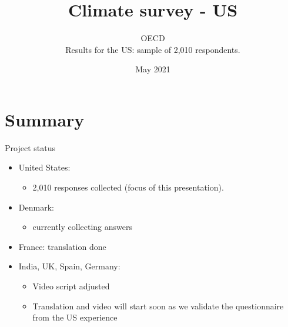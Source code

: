 \documentclass[aspectratio=169,9pt,dvipsnames]{beamer}
\title[Climate survey - US]{\huge Climate survey - US}
\author[OECD]{OECD \\ \vspace{1cm}
     Results for the US: sample of 2,010 respondents.}%
\date[\insertsection]{May 2021}
\begin{document}
	\begin{frame}

\titlepage

	\end{frame}

	
\AtBeginPart{\frame{\partpage}}

\section{Summary}
\begin{frame}{Project status}
\begin{itemize}
\item United States:
	\begin{itemize}
	\item 2,010 responses collected (focus of this presentation).
	\end{itemize}
\item Denmark: 
	\begin{itemize}
	\item currently collecting answers
	\end{itemize}
\item  France: translation done

\item India, UK, Spain, Germany:

\begin{itemize}
	\item Video script adjusted
	\item Translation and video will start soon as we validate the questionnaire from the US experience
\end{itemize}

\end{itemize}
\end{frame}
\end{document}
